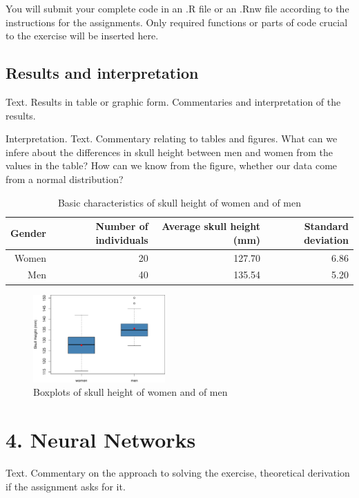 You will submit your complete code in an \textsf{.R} file or an \textsf{.Rnw} file according to the instructions for the assignments. Only required functions or parts of code crucial to the exercise will be inserted here.
\bigskip
\subsection*{Results and interpretation}
\noindent Text. Results in table or graphic form. Commentaries and interpretation of the results.

 Interpretation. Text. Commentary relating to tables and figures. What can we infere about the differences in skull height between men and women from the values in the table? How can we know from the figure, whether our data come from a normal distribution?

\begin{table}[ht]
\footnotesize
\centering

\begin{tabular}{r||rrr}
 Gender & Number of individuals & Average skull height (mm) & Standard deviation \\ 
 \hline \hline
Women & 20 & 127.70 & 6.86 \\ 
Men & 40 & 135.54 & 5.20 \\ 
\end{tabular}
\caption{Basic characteristics of skull height of women and of men}
\end{table}


\begin{figure}[ht]
\centering
\includegraphics[angle=0,width=0.45\textwidth]{boxplot-example.pdf}
\caption{Boxplots of skull height of women and of men}
\end{figure}

\newpage

\section*{4. Neural Networks}
\noindent Text. Commentary on the approach to solving the exercise, theoretical derivation if the assignment asks for it.

